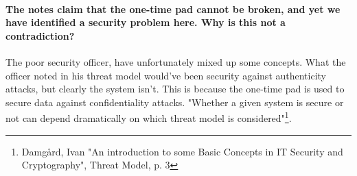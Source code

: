 \documentclass[paper=a4, fontsize=11pt]{scrartcl} %
\numberwithin{equation}{section} %
\numberwithin{figure}{section} %
\numberwithin{table}{section} %
\begin{document}
	\paragraph{The notes claim that the one-time pad cannot be broken, and yet we have identified a security problem here. Why is this not a contradiction?} The poor security officer, have unfortunately mixed up some concepts. What the officer noted in his threat model would've been security against authenticity attacks, but clearly the system isn't. This is because the one-time pad is used to secure data against confidentiality attacks. "Whether a given system is secure or not can depend dramatically on which threat model is considered"\footnote{Damgård, Ivan "An introduction to some Basic Concepts in IT Security and Cryptography", Threat Model, p. 3}.
\end{document}
